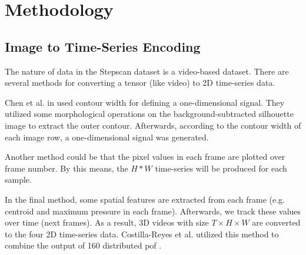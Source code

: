 
\section{Methodology}
\subsection{Image to Time-Series Encoding}
The nature of data in the Stepscan dataset is a video-based dataset. There are several methods for converting a tensor (like video) to 2D time-series data. 

Chen et al. in \cite{Chen2006GaitModel} used contour width for defining a one-dimensional signal. They utilized some morphological operations on the background-subtracted silhouette image to extract the outer contour. Afterwards, according to the contour width of each image row, a one-dimensional signal was generated.

Another method could be that the pixel values in each frame are plotted over frame number. By this means, the $H * W$ time-series will be produced for each sample.

In the final method, some spatial features are extracted from each frame (e.g. centroid and maximum pressure in each frame). Afterwards, we track these values over time (next frames). As a result, 3D videos with size $T \times H \times W$ are converted to the four 2D time-series data. Costilla-Reyes et al. utilized this method to combine the output of 160 distributed \acrshort{pof} \cite{Costilla-Reyes2018DeepSensors}.

